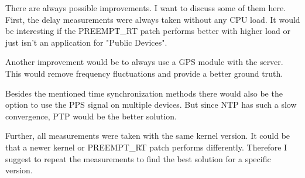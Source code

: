 There are always possible improvements. I want to discuss some of them here.
First, the delay measurements were always taken without any CPU load. It would be interesting if the PREEMPT\_RT patch performs better with higher load or just isn’t an application for "Public Devices".

Another improvement would be to always use a GPS module with the server. This would remove frequency fluctuations and provide a better ground truth.

Besides the mentioned time synchronization methods there would also be the option to use the PPS signal on multiple devices. But since NTP has such a slow convergence, PTP would be the better solution.

Further, all measurements were taken with the same kernel version. It could be that a newer kernel or PREEMPT\_RT patch performs differently. Therefore I suggest to repeat the measurements to find the best solution for a specific version.

